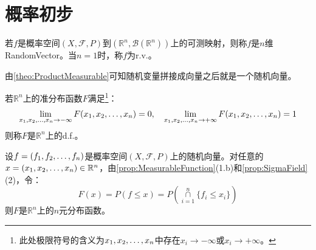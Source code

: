 \chapter{概率初步}

\begin{definition}
	若$f$是概率空间$(X,\mathscr{F},P)$到$(\mathbb{R}^{n},\mathcal{B}(\mathbb{R}^{n}))$上的可测映射，则称$f$是$n$维\gls{RandomVector}。当$n=1$时，称$f$为\gls{r.v.}。
\end{definition}
\begin{note}
	由\cref{theo:ProductMeasurable}可知随机变量拼接成向量之后就是一个随机向量。
\end{note}
\begin{definition}
	若$\mathbb{R}^{n}$上的准分布函数$F$满足\footnote{此处极限符号的含义为$x_1, x_2, \dots, x_{n}$中存在$x_i\to-\infty$或$x_i\to+\infty$。}：
	\begin{equation*}
		\lim_{x_1, x_2, \dots, x_{n}\to-\infty}F(x_1, x_2, \dots, x_{n})=0,\quad\lim_{x_1, x_2, \dots, x_{n}\to+\infty}F(x_1, x_2, \dots, x_{n})=1
	\end{equation*}
	则称$F$是$\mathbb{R}^{n}$上的\gls{d.f.}。
\end{definition}
\begin{theorem}\label{theo:MultivariateCDF}
	设$f=(f_1, f_2, \dots, f_{n})$是概率空间$(X,\mathscr{F},P)$上的随机向量。对任意的$x=(x_1, x_2, \dots, x_{n})\in\mathbb{R}^{n}$，由\cref{prop:MeasurableFunction}(1.b)和\cref{prop:SigmaField}(2)，令：
	\begin{equation*}
		F(x)=P(f\leqslant x)=P\left(\underset{i=1}{\overset{n}{\cap}}\{f_i\leqslant x_i\}\right)
	\end{equation*}
	则$F$是$\mathbb{R}^{n}$上的$n$元分布函数。
\end{theorem}
